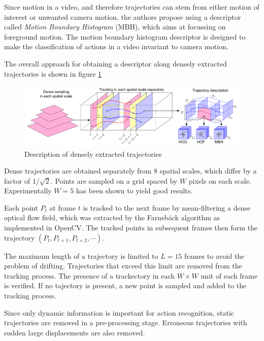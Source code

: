 Since motion in a video, and therefore trajectories can stem from either motion of interest or unwanted camera motion, the authors propose using a descriptor called \textit{Motion Boundary Histogram} (MBH), which aims at focussing on foreground motion.
The motion boundary histogram descriptor is designed to make the classification of actions in a video invariant to camera motion.

The overall approach for obtaining a descriptor along densely extracted trajectories is shown in figure \ref{fig:densetrajectories_approach}

\begin{figure}[H]
    \centering
    \includegraphics[width=\textwidth]{img_conventional/densetrajectories_approach}
    \caption{Description of densely extracted trajectories \cite{wang_action_2011}}
    \label{fig:densetrajectories_approach}
\end{figure}

Dense trajectories are obtained separately from 8 spatial scales, which differ by a factor of $1 / \sqrt{2}$.
Points are sampled on a grid spaced by $W$ pixels on each scale. Experimentally $W = 5$ has been shown to yield good results.

Each point $P_t$ at frame $t$ is tracked to the next frame by mean-filtering a dense optical flow field, which was extracted by the Farnebäck algorithm \cite{farneback_two-frame_2003} as implemented in OpenCV.
The tracked points in subsequent frames then form the trajectory $(P_t, P_{t+1}, P_{t+2}, \cdots)$.

The maximum length of a trajectory is limited to $L = 15$ frames to avoid the problem of drifting.
Trajectories that exceed this limit are removed from the tracking process.
The presence of a trackectory in each $W \times W$ unit of each frame is verified. If no tajectory is present, a new point is sampled and added to the tracking process.

Since only dynamic information is important for action recognition, static trajectories are removed in a pre-processing stage.
Erroneous trajectories with sudden large displacements are also removed.

